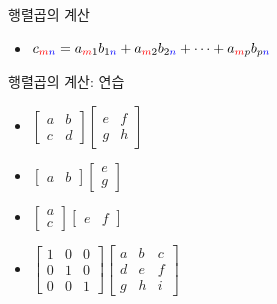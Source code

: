 \documentclass[aspectratio=169]{beamer}
\begin{document}
\begin{frame}{행렬곱의 계산}
\begin{itemize}
\begin{itemize}
    \item $ c_{\textcolor{red}{m}\textcolor{blue}{n}} = a_{\textcolor{red}{m}{1}}b_{{1}\textcolor{blue}{n}} + a_{\textcolor{red}{m}{2}}b_{{2}\textcolor{blue}{n}} + \cdots + a_{\textcolor{red}{m}{p}}b_{{p}\textcolor{blue}{n}} $
  \end{itemize}
\end{itemize}
\end{frame}



\begin{frame}{행렬곱의 계산: 연습}
\begin{itemize}
    \item \(  \begin{bmatrix} a & b \\ c & d \end{bmatrix}
              \begin{bmatrix} e & f \\ g & h \end{bmatrix} \)
    \vspace{10pt}
    \item \(  \begin{bmatrix} a & b \end{bmatrix}
              \begin{bmatrix} e \\ g \end{bmatrix} \)
    \vspace{10pt}
    \item \(  \begin{bmatrix} a  \\ c  \end{bmatrix}
              \begin{bmatrix} e & f \end{bmatrix} \)
    \vspace{10pt}
    \item \(  \begin{bmatrix} 1 & 0 & 0 \\ 0 & 1 & 0 \\ 0 & 0 & 1 \end{bmatrix}
              \begin{bmatrix} a & b & c \\ d & e & f \\ g & h & i \end{bmatrix} \)
    \vspace{10pt}
\end{itemize}
\end{frame}
\end{document}
